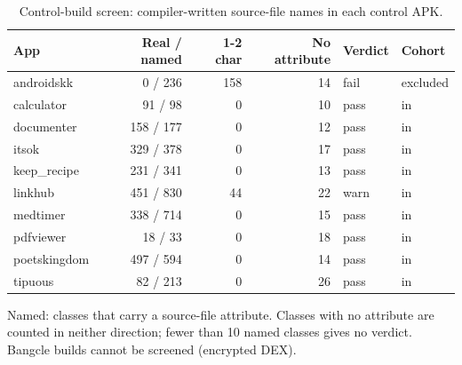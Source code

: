 \begin{table}[t]
\centering
\small
\caption{Control-build screen: compiler-written source-file names in each control APK.}
\label{tab:control-screen}
\begin{tabular}{lrrrll}
\toprule
\textbf{App} & \textbf{Real / named} & \textbf{1-2 char} & \textbf{No attribute} & \textbf{Verdict} & \textbf{Cohort} \\
\midrule
androidskk & 0 / 236 & 158 & 14 & fail & excluded \\
calculator & 91 / 98 & 0 & 10 & pass & in \\
documenter & 158 / 177 & 0 & 12 & pass & in \\
itsok & 329 / 378 & 0 & 17 & pass & in \\
keep\_recipe & 231 / 341 & 0 & 13 & pass & in \\
linkhub & 451 / 830 & 44 & 22 & warn & in \\
medtimer & 338 / 714 & 0 & 15 & pass & in \\
pdfviewer & 18 / 33 & 0 & 18 & pass & in \\
poetskingdom & 497 / 594 & 0 & 14 & pass & in \\
tipuous & 82 / 213 & 0 & 26 & pass & in \\
\bottomrule
\end{tabular}
\par\smallskip\footnotesize Named: classes that carry a source-file attribute. Classes with no attribute are counted in neither direction; fewer than 10 named classes gives no verdict. Bangcle builds cannot be screened (encrypted DEX).
\end{table}
